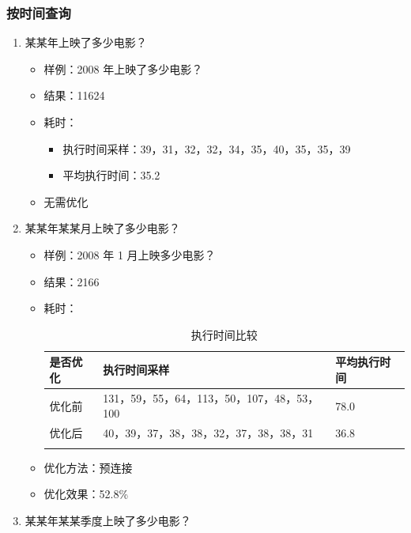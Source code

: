 \documentclass{ctexrep}
\begin{document}
	\subsubsection{按时间查询}
	    \begin{enumerate}
	        \item 某某年上映了多少电影？
    	        \begin{itemize}
    	            \item 样例：2008 年上映了多少电影？
    	            \item 结果：11624
    	            \item 耗时：
    	                \begin{itemize}
    	                    \item 执行时间采样：39，31，32，32，34，35，40，35，35，39
    	                    \item 平均执行时间：35.2
    	                \end{itemize}
    	            \item 无需优化
    	        \end{itemize}
    	    \item 某某年某某月上映了多少电影？
    	        \begin{itemize}
    	            \item 样例：2008 年 1 月上映多少电影？
    	            \item 结果：2166
    	            \item 耗时：
    	                \begin{longtable}{l|p{5cm}|l}
    	                    \hline
    	                    是否优化 & 执行时间采样 & 平均执行时间\\
    	                    \hline
    	                    \hline
    	                    优化前 & 131，59，55，64，113，50，107，48，53，100 & 78.0\\
    	                    优化后 &
    	                    40，39，37，38，38，32，37，38，38，31 & 36.8\\
    	                    \hline
    	                    \caption{执行时间比较}
    	                \end{longtable}
    	            \item 优化方法：预连接
    	            \item 优化效果：52.8\%
    	        \end{itemize}
    	    \item 某某年某某季度上映了多少电影？
    	        \begin{itemize}

\end{itemize}
\end{enumerate}
\end{document}
